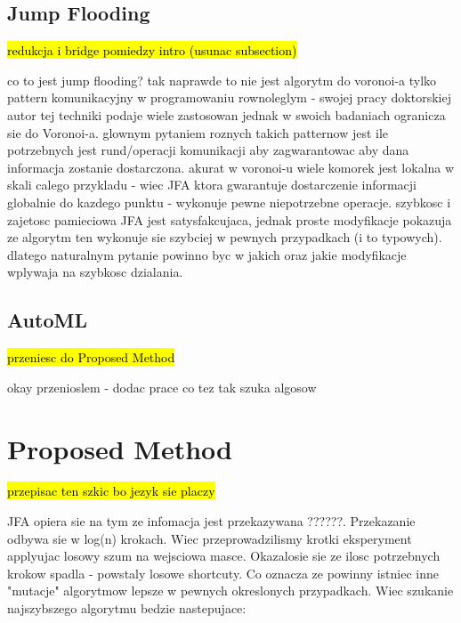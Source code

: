 \documentclass{article}
\begin{document}
\subsection{Jump Flooding} %

\hl{redukcja i bridge pomiedzy intro (usunac subsection)}

co to jest jump flooding? tak naprawde to nie jest algorytm do voronoi-a tylko
pattern komunikacyjny w programowaniu rownoleglym - swojej pracy doktorskiej
autor tej techniki podaje wiele zastosowan jednak w swoich badaniach ogranicza
sie do Voronoi-a. glownym pytaniem roznych takich patternow jest ile potrzebnych
jest rund/operacji komunikacji aby zagwarantowac aby dana informacja zostanie
dostarczona. akurat w voronoi-u wiele komorek jest lokalna w skali calego
przykladu - wiec JFA ktora gwarantuje dostarczenie informacji globalnie do
kazdego punktu - wykonuje pewne niepotrzebne operacje.  szybkosc i zajetosc
pamieciowa JFA jest satysfakcujaca, jednak proste modyfikacje pokazuja ze
algorytm ten wykonuje sie szybciej w pewnych przypadkach (i to typowych).
dlatego naturalnym pytanie powinno byc w jakich oraz jakie modyfikacje wplywaja
na szybkosc dzialania.

\subsection{AutoML} %

\hl{przeniesc do Proposed Method}

okay przenioslem - dodac prace co tez tak szuka algosow

\section{Proposed Method} %

\hl{przepisac ten szkic bo jezyk sie placzy}

JFA opiera sie na tym ze infomacja jest przekazywana ??????.  Przekazanie odbywa
sie w log(n) krokach. Wiec przeprowadzilismy krotki eksperyment applyujac losowy
szum na wejsciowa masce. Okazalosie sie ze ilosc potrzebnych krokow spadla -
powstaly losowe shortcuty.  Co oznacza ze powinny istniec inne "mutacje"
algorytmow lepsze w pewnych okreslonych przypadkach.  Wiec szukanie najszybszego
algorytmu bedzie nastepujace:
\end{document}
